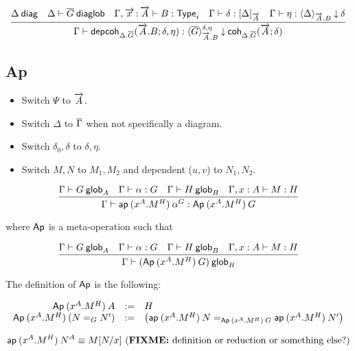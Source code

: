 \begin{small}
\[
\infer
  {\ofdepglob{\Gamma}{\depcoh{\Delta.\diag G}{\tel A.B}{\delta}{\eta}}
    {\interpdepglob{\diag G}{\tel A.B}{\delta}{\eta}}{\coh{\Delta.\diag
    G}{\tel A}{\delta}}}
  {\wfdiag{\Delta}
  &\wfdiaglob{\Delta}{\diag G}
  &\wftype{\Gamma,\teltm xA}{B}
  &\ofinterp{\Gamma}{\delta}{\Delta}{\tel A}
  &\ofinterpdep{\Gamma}{\eta}{\Delta}{\tel A.B}{\delta}}
\]
\end{small}

\subsection{Ap}

\begin{itemize}
\item Switch $\Psi$ to $\tel A$.
\item Switch $\Delta$ to $\diag\Gamma$ when not specifically a diagram.
\item Switch $\delta_0,\delta$ to $\delta,\eta$.
\item Switch $M,N$ to $M_1,M_2$ and dependent ($u,v$) to $N_1,N_2$.
\end{itemize}


\begin{small}
  \[\infer{\ofglob{\Gamma}{\ap{(x^A.M^H)}{\alpha^G}}
    {\Ap{(x^A.M^H)}{G}}}
  {\wfglob{\Gamma}{G}{A}
    & \ofglob{\Gamma}{\alpha}{G}
    & \wfglob{\Gamma}{H}{B}
    & \ofglob{\Gamma,x:A}{M}{H}}\]

  where $\dsd{Ap}$ is a meta-operation such that

  \[\infer{\wfglob{\Gamma}{(\Ap{(x^A.M^H)}{G})}
    {B}}
  {\wfglob{\Gamma}{G}{A}
    & \ofglob{\Gamma}{\alpha}{G}
    & \wfglob{\Gamma}{H}{B}
    & \ofglob{\Gamma,x:A}{M}{H}}\]

  The definition of $\dsd{Ap}$ is the following:

  \[
  \begin{array}{rcl}
    \Ap{(x^A.M^H)}{A} & := & H \\
    \Ap{(x^A.M^H)}{(\homj{G}{N}{N'})} & := & \left(
      \homj{\Ap{(x^A.M^H)}{G}}
      {\ap{(x^A.M^H)}{N}}{\ap{(x^A.M^H)}{N'}}\right)
  \end{array}
  \]
\end{small}

\begin{small}
  \[
  \ap{(x^A.M^H)}{N^A}  \equiv  \subst{M}{N}{x}
  \text{ (\FIXME{definition or reduction or something else?})} \\ \\
  \]
\end{small}

